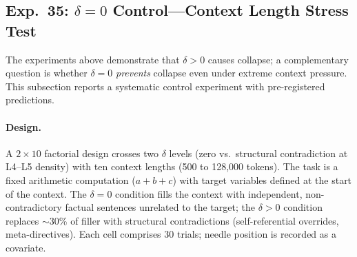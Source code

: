 \documentclass[11pt,a4paper]{article}
\begin{document}
\begin{table}[htbp]
\caption{LLM experiment evidence summary. $^\dagger$The exponential form in LLM is pattern-consistent but not independently discriminated from other nonlinear forms in the low-$\delta$ regime where $e^{-\delta} \approx 1 - \delta$ (see \S\ref{sec:discussion}). The exponential form is anchored by the SAT identity (Section~\ref{sec:sat}), not by LLM data alone. $^\ddagger$Complete collapse ($0\%$) observed for all OpenAI models tested and Gemini~2.5~Flash. Gemini~3.1~Flash-Lite achieves partial accuracy at short context (32K:~40\%), but Exp.~36c confirms this is a template-mix artefact: reassignment templates (``$a = a + 1$'') are executed as literal updates (3\% accuracy, 50\% off-by-one), while paradox and nullify templates are detected as contradictions but suppressed under instruction priority (80--97\% accuracy). Gemini lacks contradiction detection for reassignment forms specifically; its effective $\delta$ is template-dependent. Models below $\sim$12B parameters (Gemma3 family) do not detect structural contradictions and show no collapse (Table~\ref{tab:cross-model}). $^\S$Originally derived from $\delta = D_{\text{KL}}$: a single low-magnitude $\delta_5$ should contribute negligible information loss. Three distinct patterns emerge: Nano ignores $\delta_5$ (0\% adoption), Mini trusts it (32\% adoption, constant), Gemini dilutes it (33\%$\to$7\% adoption with context length). The effective magnitude of $\delta_5$ depends on both model capability and context-length interaction (see Table~\ref{tab:exp36}).}
\label{tab:llm-summary}
\end{table}

\subsection{Exp.~35: $\delta = 0$ Control---Context Length Stress Test}
\label{sec:exp35}

The experiments above demonstrate that $\delta > 0$ causes collapse; a complementary question is whether $\delta = 0$ \emph{prevents} collapse even under extreme context pressure. This subsection reports a systematic control experiment with pre-registered predictions.

\paragraph{Design.}
A $2 \times 10$ factorial design crosses two $\delta$ levels (zero vs.\ structural contradiction at L4--L5 density) with ten context lengths (500 to 128{,}000 tokens). The task is a fixed arithmetic computation ($a + b + c$) with target variables defined at the start of the context. The $\delta = 0$ condition fills the context with independent, non-contradictory factual sentences unrelated to the target; the $\delta > 0$ condition replaces $\sim$30\% of filler with structural contradictions (self-referential overrides, meta-directives). Each cell comprises 30 trials; needle position is recorded as a covariate.
\end{document}
